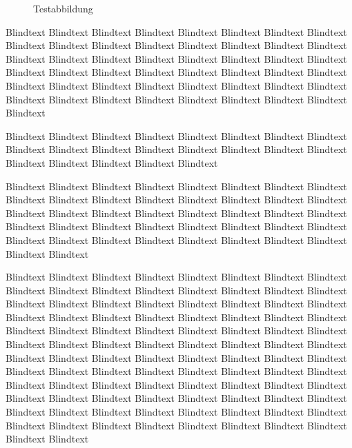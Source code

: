 \begin{figure}[!htbp]
  \centering
  \caption{Testabbildung}
  \label{fig:test}
\end{figure}

Blindtext Blindtext Blindtext Blindtext Blindtext Blindtext Blindtext
Blindtext Blindtext Blindtext Blindtext Blindtext Blindtext Blindtext
Blindtext Blindtext Blindtext Blindtext Blindtext Blindtext Blindtext
Blindtext Blindtext Blindtext Blindtext Blindtext Blindtext Blindtext
Blindtext Blindtext Blindtext Blindtext Blindtext Blindtext Blindtext
Blindtext Blindtext Blindtext Blindtext Blindtext Blindtext Blindtext
Blindtext Blindtext Blindtext Blindtext Blindtext Blindtext Blindtext

Blindtext Blindtext Blindtext Blindtext Blindtext Blindtext Blindtext
Blindtext Blindtext Blindtext Blindtext Blindtext Blindtext Blindtext
Blindtext Blindtext Blindtext Blindtext Blindtext Blindtext Blindtext

Blindtext Blindtext Blindtext Blindtext Blindtext Blindtext Blindtext
Blindtext Blindtext Blindtext Blindtext Blindtext Blindtext Blindtext
Blindtext Blindtext Blindtext Blindtext Blindtext Blindtext Blindtext
Blindtext Blindtext Blindtext Blindtext Blindtext Blindtext Blindtext
Blindtext Blindtext Blindtext Blindtext Blindtext Blindtext Blindtext
Blindtext Blindtext Blindtext Blindtext Blindtext Blindtext Blindtext

Blindtext Blindtext Blindtext Blindtext Blindtext Blindtext Blindtext
Blindtext Blindtext Blindtext Blindtext Blindtext Blindtext Blindtext
Blindtext Blindtext Blindtext Blindtext Blindtext Blindtext Blindtext
Blindtext Blindtext Blindtext Blindtext Blindtext Blindtext Blindtext
Blindtext Blindtext Blindtext Blindtext Blindtext Blindtext Blindtext
Blindtext Blindtext Blindtext Blindtext Blindtext Blindtext Blindtext
Blindtext Blindtext Blindtext Blindtext Blindtext Blindtext Blindtext
Blindtext Blindtext Blindtext Blindtext Blindtext Blindtext Blindtext
Blindtext Blindtext Blindtext Blindtext Blindtext Blindtext Blindtext
Blindtext Blindtext Blindtext Blindtext Blindtext Blindtext Blindtext
Blindtext Blindtext Blindtext Blindtext Blindtext Blindtext Blindtext
Blindtext Blindtext Blindtext Blindtext Blindtext Blindtext Blindtext
Blindtext Blindtext Blindtext Blindtext Blindtext Blindtext Blindtext
Blindtext Blindtext Blindtext Blindtext Blindtext Blindtext Blindtext

